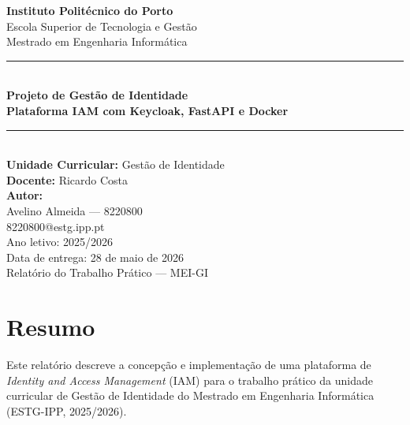 \documentclass[12pt,a4paper]{article}
\begin{document}
\begin{titlepage}
  \thispagestyle{empty}
  \centering
  \vspace*{1cm}

  {\large \textbf{Instituto Politécnico do Porto}}\\[0.3cm]
  {\large Escola Superior de Tecnologia e Gestão}\\[0.3cm]
  {\large Mestrado em Engenharia Informática}\\[2cm]

  \rule{\linewidth}{1.5pt}\\[0.5cm]
  {\Huge \bfseries Projeto de Gestão de Identidade}\\[0.4cm]
  {\LARGE \bfseries Plataforma IAM com Keycloak, FastAPI e Docker}\\[0.3cm]
  \rule{\linewidth}{1.5pt}\\[1.5cm]

  {\large \textbf{Unidade Curricular:} Gestão de Identidade}\\[0.3cm]
  {\large \textbf{Docente:} Ricardo Costa}\\[1.5cm]

  {\large \textbf{Autor:}}\\[0.3cm]
  {\Large Avelino Almeida — 8220800}\\[0.2cm]
  {\large 8220800@estg.ipp.pt}\\[2cm]

  {\large Ano letivo: 2025/2026}\\[0.5cm]
  {\large Data de entrega: 28 de maio de 2026}\\[2cm]

  \vfill
  {\small Relatório do Trabalho Prático — MEI-GI}
\end{titlepage}

\newpage
\thispagestyle{empty}
\section*{Resumo}

Este relatório descreve a concepção e implementação de uma plataforma de \textit{Identity and Access Management} (IAM) para o trabalho prático da unidade curricular de Gestão de Identidade do Mestrado em Engenharia Informática (ESTG-IPP, 2025/2026).
\end{document}
